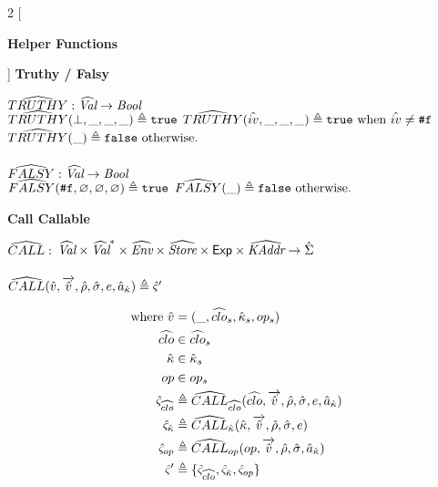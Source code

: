 \documentclass[12pt,draft]{article}
\newcommand{\falsesyn}{\texttt{\#f}}
\begin{document}
\begin{multicols*}{2}
  [
  \begin{center}
    \textbf{Helper Functions}
  \end{center}
  ]
  \noindent \textbf{Truthy / Falsy}
  \begin{center}
    $\widehat{TRUTHY} : \widehat{\textit{Val}} \rightarrow \textit{Bool}$ \\
    $\widehat{TRUTHY}(\bot , \_, \_, \_) \triangleq \texttt{true}$
    $\aTRUTHY(\aival , \_, \_, \_) \triangleq \texttt{true}
    \text{ when } \aival \neq \falsesyn$
    $\widehat{TRUTHY}(\_) \triangleq \texttt{false} \text{ otherwise.}$ \\ \; \\
    $\widehat{FALSY} : \widehat{\textit{Val}} \rightarrow \textit{Bool}$ \\
    $\aFALSY(\falsesyn , \varnothing, \varnothing, \varnothing)
    \triangleq \texttt{true}$
    $\widehat{FALSY}(\_) \triangleq \texttt{false} \text{ otherwise.}$
  \end{center}
  \textbf{Call Callable}
  \begin{center}
    $\widehat{CALL} : $
    $\widehat{\textit{Val}} \times \widehat{\textit{Val}}^* \times \widehat{\textit{Env}} \times \widehat{\textit{Store}} \times \textsf{Exp} \times
    \widehat{\textit{KAddr}} \rightarrow \hat{\Sigma} $ \\ \; \\
    $\widehat{CALL}(\hat{v} , \overrightarrow{\hat{v}} , \hat{\rho} , \hat{\sigma} , e , \hat{a}_{\hat{\kappa}})
    \triangleq \hat{\varsigma}'$
  \end{center}
  \vspace{-7mm}
  \begin{align*}
    \text{where }
    \aval &= (\_ , \aclo_s , \akont_s , op_s) \\
    \aclo &\in \aclo_s \\
    \akont &\in \akont_s \\
    op &\in op_s \\
    \astate_{\aclo} &\triangleq \aCALL_{\aclo}(\aclo , \overrightarrow{\aval} ,
                    \aenv , \astore , e , \akaddr) \\
    \astate_{\akont} &\triangleq \aCALL_{\akont}(\akont , \overrightarrow{\aval} ,
                       \aenv , \astore , e) \\
    \astate_{op} &\triangleq \aCALL_{op}(op , \overrightarrow{\aval} ,
                   \aenv , \astore , \akaddr) \\
    \astate' &\triangleq \{\astate_{\aclo} , \astate_{\akont} , \astate_{op}\}

\end{align*}
\end{multicols*}
\end{document}
